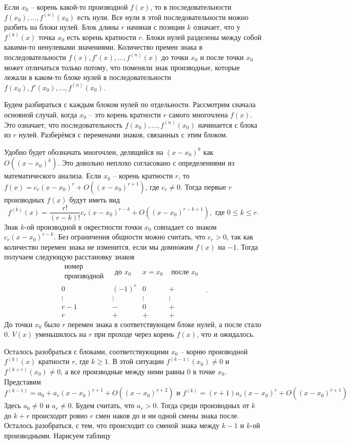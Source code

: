 Если $x_0$ -- корень какой-то производной $f(x)$, то в последовательности $f(x_0),\dots,f^{(n)}(x_0)$ есть нули. Все нули в этой последовательности можно разбить на блоки нулей. Блок длины $r$ начиная с позиции $k$ означает, что у $f^{(k)}(x)$ точка $x_0$ есть корень кратности $r$. Блоки нулей разделены между собой какими-то ненулевыми значениями. Количество премен знака в последовательности $f(x),f'(x),\dots, f^{(n)}(x)$ до точки $x_0$ и после точки $x_0$ может отличаться только потому, что поменяли знак производные, которые лежали в каком-то блоке нулей в последовательности $f(x_0),f'(x_0),\dots, f^{(n)}(x_0)$. 

Будем разбираться с каждым блоком нулей по отдельности. Рассмотрим сначала основной случай, когда $x_0$ -- это корень кратности $r$ самого многочлена $f(x)$. Это означает, что последовательность $f(x_0), \dots, f^{(n)}(x_0)$ начинается с блока из $r$ нулей. Разберёмся с переменами знаков, связанных с этим блоком.

Удобно будет обозначать многочлен, делящийся на $(x-x_0)^k$ как $O((x-x_0)^k)$. Это довольно неплохо согласовано с определениями из математического анализа. Если $x_0$ -- корень кратности $r$, то  $f(x)=c_r(x-x_0)^r + O((x-x_0)^{r+1})$, где $c_r\neq 0$.  Тогда первые $r$ производных $f(x)$ будут иметь вид $$f^{(k)}(x)= \frac{r!}{(r-k)!}c_r(x-x_0)^{r-k}+O((x-x_0)^{r-k+1}), \text{ где } 0\leq k\leq r.$$ 
Знак $k$-ой производной в окрестности точки $x_0$ совпадает со знаком $c_r(x-x_0)^{r-k}$. Без ограничения общности можно считать, что $c_r>0$, так как количество перемен знака не изменится, если мы домножим $f(x)$ на $-1$. Тогда получаем следующую расстановку знаков
$$\begin{array}{c|c|c|c}
 \substack{\text{номер}\\ \text{производной} } &\text{ до $x_0$ }& x=x_0 & \text{ после $x_0$ }\\
\hline
0 & (-1)^r & 0 & +\\
\hline
\vdots & \vdots & \vdots & \vdots \\
\hline
r-1 & - & 0 & +\\
r & + & + & +
\end{array}.$$
До точки $x_0$ было $r$ перемен знака в соответствующем блоке нулей, а после стало $0$. $V(x)$ уменьшилось на $r$ при проходе через корень $f(x)$, что и ожидалось.

Осталось разобраться с блоками, соответствующими $x_0$ -- корню производной  $f^{(k)}(x)$ кратности $r$, где $k\geq 1$. В этой ситуации $f^{(k-1)}(x_0)\neq 0$ и $f^{(k+r)}(x_0)\neq 0$, а все производные между ними равны 0 в точке $x_0$. Представим 
$$f^{(k-1)}= a_0+ a_r(x-x_0)^{r+1}+O((x-x_0)^{r+2}) \text{ и } f^{(k)}=(r+1)a_r(x-x_0)^r+O((x-x_0)^{r+1})$$
Здесь $a_0\neq 0$  и $a_r \neq 0$. Будем считать, что $a_r>0$. Тогда среди производных от $k$ до $k+r$ происходит ровно $r$ смен наков до  и ни одной смены знака после. Осталось разобраться, с тем, что происходит со сменой знака между $k-1$ и $k$-ой производными. Нарисуем таблицу   

